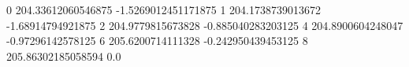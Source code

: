 0 204.33612060546875 -1.5269012451171875
1 204.1738739013672 -1.68914794921875
2 204.9779815673828 -0.885040283203125
4 204.8900604248047 -0.97296142578125
6 205.6200714111328 -0.242950439453125
8 205.86302185058594 0.0
